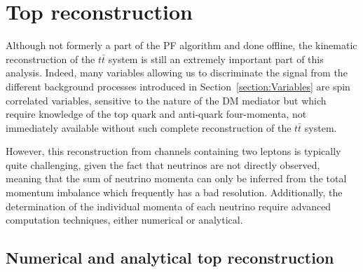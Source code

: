 \documentclass[a4paper, 10pt, openright]{report}
\begin{document}
\section{Top reconstruction} \label{section:RecoTop}

Although not formerly a part of the \ac{PF} algorithm and done offline, the kinematic reconstruction of the $t \bar t$ system is still an extremely important part of this analysis. Indeed, many variables allowing us to discriminate the signal from the different background processes introduced in Section~\ref{section:Variables} are spin correlated variables, sensitive to the nature of the \ac{DM} mediator but which require knowledge of the top quark and anti-quark four-momenta, not immediately available without such complete reconstruction of the $t \bar t$ system. 

However, this reconstruction from channels containing two leptons is typically quite challenging, given the fact that neutrinos are not directly observed, meaning that the sum of neutrino momenta can only be inferred from the total momentum imbalance which frequently has a bad resolution. Additionally, the determination of the individual momenta of each neutrino require advanced computation techniques, either numerical or analytical.

\subsection{Numerical and analytical top reconstruction}
\end{document}
